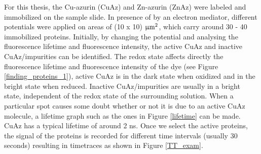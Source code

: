 \documentclass[twoside,single]{lion-msc}
\begin{document}
For this thesis, the Cu-azurin (CuAz) and Zn-azurin (ZnAz) were labeled and immobilized on the sample slide. In presence of by an electron mediator, different potentials were applied on areas of (10 x 10) $\upmu \textup{m}^{2}$, which carry around 30 - 40 immobilized proteins. Initially, by changing the potential and analysing the fluorescence lifetime and fluorescence intensity, the active CuAz and inactive CuAz/impurities can be identified. The redox state affects directly the fluorescence lifetime and fluorescence intensity of the dye (see Figure \ref{finding_proteins_1}),  active CuAz is in the dark state when oxidized and in the bright state when reduced. Inactive CuAz/impurities are usually in a bright state, independent of the redox state of the surrounding solution. When a particular spot causes some doubt whether or not it is due to an active CuAz molecule, a lifetime graph such as the ones in Figure \ref{lifetime} can be made. CuAz has a typical lifetime of around 2 ns. 
Once we select the active proteins, the signal of the proteins is recorded for different time intervals (usually 30 seconds) resulting in timetraces as shown in Figure \ref{TT_exam}.
\end{document}
